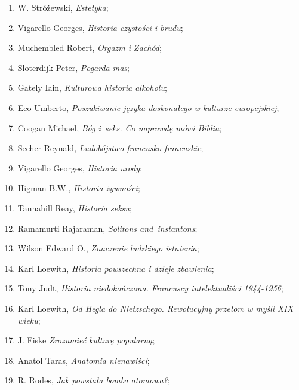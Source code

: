 \documentclass[a4paper,11pt]{article}
\begin{document}
\begin{enumerate}
\item W. Stróżewski, \emph{Estetyka};

\item Vigarello Georges, \emph{Historia czystości i brudu};

\item Muchembled Robert, \emph{Orgazm i Zachód};

\item Sloterdijk Peter, \emph{Pogarda mas};

\item Gately Iain, \emph{Kulturowa historia alkoholu};

\item Eco Umberto, \emph{Poszukiwanie języka doskonałego w kulturze
    europejskiej};

\item Coogan Michael, \emph{Bóg i~seks. Co naprawdę mówi Biblia};

\item Secher Reynald, \emph{Ludobójstwo francusko-francuskie};

\item Vigarello Georges, \emph{Historia urody};

\item Higman B.W., \emph{Historia żywności};

\item Tannahill Reay, \emph{Historia seksu};

\item Ramamurti Rajaraman, \emph{Solitons and~instantons};

\item Wilson Edward O., \emph{Znaczenie ludzkiego istnienia};

\item Karl Loewith, \emph{Historia powszechna i dzieje zbawienia};

\item Tony Judt, \emph{Historia niedokończona. Francuscy
    intelektualiści 1944-1956};

\item Karl Loewith, \emph{Od Hegla do Nietzschego. Rewolucyjny przełom
    w myśli XIX wieku};

\item J. Fiske \emph{Zrozumieć kulturę popularną};

\item Anatol Taras, \emph{Anatomia nienawiści};

\item R. Rodes, \emph{Jak powstała bomba atomowa?};


\end{enumerate}
\end{document}
